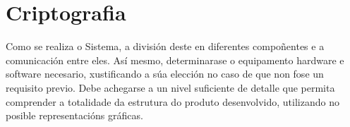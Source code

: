 \chapter{Criptografia}

Como se realiza o Sistema, a división deste en diferentes compoñentes e a comunicación entre eles. Así mesmo, determinarase o equipamento hardware e software necesario, xustificando a súa elección no caso de que non fose un requisito previo. Debe achegarse a un nivel suficiente de detalle que permita comprender a totalidade da estrutura do produto desenvolvido, utilizando no posible representacións gráficas.